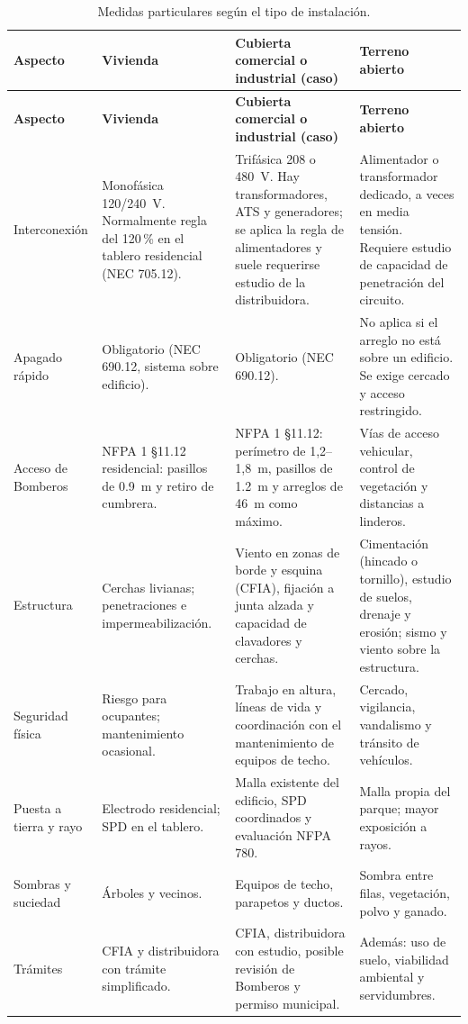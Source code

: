 \documentclass[12pt]{article}
\begin{document}
{\small
\begin{longtable}{L{2.3cm}L{4.0cm}L{4.1cm}L{4.0cm}}
\caption{Medidas particulares según el tipo de instalación.}\label{tab:comparacion}\\
\toprule
\textbf{Aspecto} & \textbf{Vivienda} & \textbf{Cubierta comercial o industrial (caso)} & \textbf{Terreno abierto}\\
\midrule\endfirsthead
\toprule
\textbf{Aspecto} & \textbf{Vivienda} & \textbf{Cubierta comercial o industrial (caso)} & \textbf{Terreno abierto}\\
\midrule\endhead
Interconexión & Monofásica 120/240~V. Normalmente regla del 120\,\% en el tablero residencial (NEC 705.12). & Trifásica 208 o 480~V. Hay transformadores, ATS y generadores; se aplica la regla de alimentadores y suele requerirse estudio de la distribuidora. & Alimentador o transformador dedicado, a veces en media tensión. Requiere estudio de capacidad de penetración del circuito.\\
Apagado rápido & Obligatorio (NEC 690.12, sistema sobre edificio). & Obligatorio (NEC 690.12). & No aplica si el arreglo no está sobre un edificio. Se exige cercado y acceso restringido.\\
Acceso de Bomberos & NFPA 1 §11.12 residencial: pasillos de \SI{0.9}{\meter} y retiro de cumbrera. & NFPA 1 §11.12: perímetro de 1,2--1,8~m, pasillos de \SI{1.2}{\meter} y arreglos de 46~m como máximo. & Vías de acceso vehicular, control de vegetación y distancias a linderos.\\
Estructura & Cerchas livianas; penetraciones e impermeabilización. & Viento en zonas de borde y esquina (CFIA), fijación a junta alzada y capacidad de clavadores y cerchas. & Cimentación (hincado o tornillo), estudio de suelos, drenaje y erosión; sismo y viento sobre la estructura.\\
Seguridad física & Riesgo para ocupantes; mantenimiento ocasional. & Trabajo en altura, líneas de vida y coordinación con el mantenimiento de equipos de techo. & Cercado, vigilancia, vandalismo y tránsito de vehículos.\\
Puesta a tierra y rayo & Electrodo residencial; SPD en el tablero. & Malla existente del edificio, SPD coordinados y evaluación NFPA 780. & Malla propia del parque; mayor exposición a rayos.\\
Sombras y suciedad & Árboles y vecinos. & Equipos de techo, parapetos y ductos. & Sombra entre filas, vegetación, polvo y ganado.\\
Trámites & CFIA y distribuidora con trámite simplificado. & CFIA, distribuidora con estudio, posible revisión de Bomberos y permiso municipal. & Además: uso de suelo, viabilidad ambiental y servidumbres.\\
\bottomrule
\end{longtable}}
\end{document}
